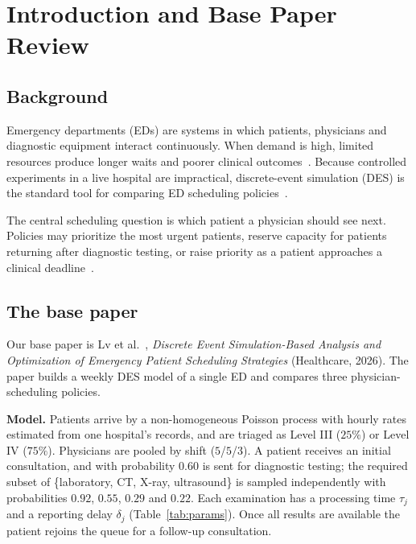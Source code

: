 \documentclass[sigconf]{acmart}
\begin{document}

\maketitle


\section{Introduction and Base Paper Review}
\label{sec:intro}

\subsection{Background}

Emergency departments (EDs) are systems in which patients, physicians and
diagnostic equipment interact continuously. When demand is high, limited
resources produce longer waits and poorer clinical outcomes~\cite{hoot2008crowding}.
Because controlled experiments in a live hospital are impractical,
discrete-event simulation (DES) is the standard tool for comparing ED
scheduling policies~\cite{gul2015review,vanbrabant2019review,saghafian2015review,
law2015simulation,banks2010des}.

The central scheduling question is which patient a physician should see next.
Policies may prioritize the most urgent patients, reserve capacity for patients
returning after diagnostic testing, or raise priority as a patient approaches a
clinical deadline~\cite{davenport2001slack}.

\subsection{The base paper}

Our base paper is Lv et al.~\cite{lv2026des}, \emph{Discrete Event
Simulation-Based Analysis and Optimization of Emergency Patient Scheduling
Strategies} (Healthcare, 2026). The paper builds a weekly DES model of a single
ED and compares three physician-scheduling policies.

\textbf{Model.} Patients arrive by a non-homogeneous Poisson process with
hourly rates estimated from one hospital's records, and are triaged as Level
III ($25\%$) or Level IV ($75\%$). Physicians are pooled by shift ($5$/$5$/$3$).
A patient receives an initial consultation, and with probability $0.60$ is sent
for diagnostic testing; the required subset of \{laboratory, CT, X-ray,
ultrasound\} is sampled independently with probabilities $0.92$, $0.55$, $0.29$
and $0.22$. Each examination has a processing time $\tau_j$ and a reporting
delay $\delta_j$ (Table~\ref{tab:params}). Once all results are available the
patient rejoins the queue for a follow-up consultation.
\end{document}

